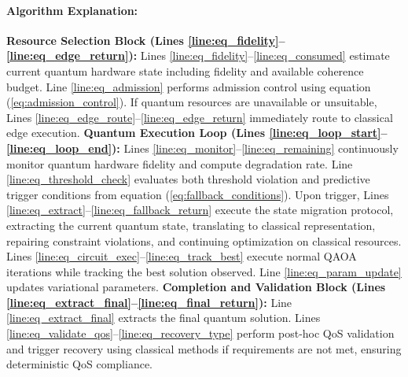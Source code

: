 \documentclass[lettersize,journal]{IEEEtran}
\begin{document}
\paragraph{Algorithm Explanation:}
\textbf{Resource Selection Block (Lines \ref{line:eq_fidelity}--\ref{line:eq_edge_return}):} Lines \ref{line:eq_fidelity}--\ref{line:eq_consumed} estimate current quantum hardware state including fidelity and available coherence budget. Line \ref{line:eq_admission} performs admission control using equation (\ref{eq:admission_control}). If quantum resources are unavailable or unsuitable, Lines \ref{line:eq_edge_route}--\ref{line:eq_edge_return} immediately route to classical edge execution.
\textbf{Quantum Execution Loop (Lines \ref{line:eq_loop_start}--\ref{line:eq_loop_end}):} Lines \ref{line:eq_monitor}--\ref{line:eq_remaining} continuously monitor quantum hardware fidelity and compute degradation rate. Line \ref{line:eq_threshold_check} evaluates both threshold violation and predictive trigger conditions from equation (\ref{eq:fallback_conditions}). Upon trigger, Lines \ref{line:eq_extract}--\ref{line:eq_fallback_return} execute the state migration protocol, extracting the current quantum state, translating to classical representation, repairing constraint violations, and continuing optimization on classical resources. Lines \ref{line:eq_circuit_exec}--\ref{line:eq_track_best} execute normal QAOA iterations while tracking the best solution observed. Line \ref{line:eq_param_update} updates variational parameters.
\textbf{Completion and Validation Block (Lines \ref{line:eq_extract_final}--\ref{line:eq_final_return}):} Line \ref{line:eq_extract_final} extracts the final quantum solution. Lines \ref{line:eq_validate_qos}--\ref{line:eq_recovery_type} perform post-hoc QoS validation and trigger recovery using classical methods if requirements are not met, ensuring deterministic QoS compliance.
\end{document}
